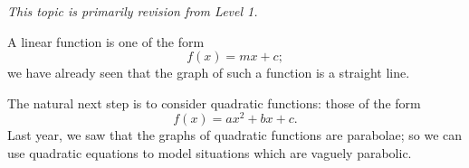 



\emph{This topic is primarily revision from Level 1.}

A linear function is one of the form
\begin{displaymath}
  f(x) = mx + c;
\end{displaymath}
we have already seen that the graph of such a function is a straight line.

The natural next step is to consider quadratic functions: those of the form
\begin{displaymath}
  f(x) = ax^2 + bx + c.
\end{displaymath}
Last year, we saw that the graphs of quadratic functions are parabolae; so we can use quadratic equations to model situations
which are vaguely parabolic.

